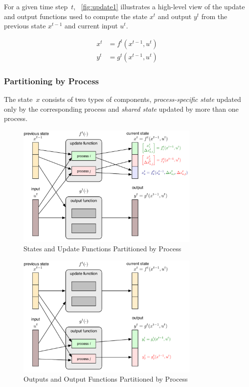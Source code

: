 \documentclass[12pt]{article}
\numberwithin{equation}{section}
\numberwithin{table}{section}
\numberwithin{figure}{section}
\begin{document}
For a given time step~$t$, \figurename~\ref{fig:update1} illustrates a high-level view of the update and output functions used to compute the state $x^t$ and output $y^t$ from the previous state $x^{t-1}$ and current input $u^t$.

\begin{align}
x^t &= f^t(x^{t-1}, u^t) \label{eq:update} \\
y^t &= g^t(x^{t-1}, u^t) \label{eq:output}
\end{align}

\subsubsection{Partitioning by Process}
\label{sec:partitioning}

The state~$x$ consists of two types of components, \emph{process-specific state} updated only by the corresponding process and \emph{shared state} updated by more than one process.

\begin{figure}[hbtp]
  \centering
  \includegraphics[width=0.8\textwidth]{figures/simulator-update-diagram-5}
  \caption{States and Update Functions Partitioned by Process}
  \label{fig:update5}
\end{figure}

\begin{figure}[hbtp]
  \centering
  \includegraphics[width=0.8\textwidth]{figures/simulator-update-diagram-7}
  \caption{Outputs and Output Functions Partitioned by Process}
  \label{fig:update7}
\end{figure}
\end{document}
